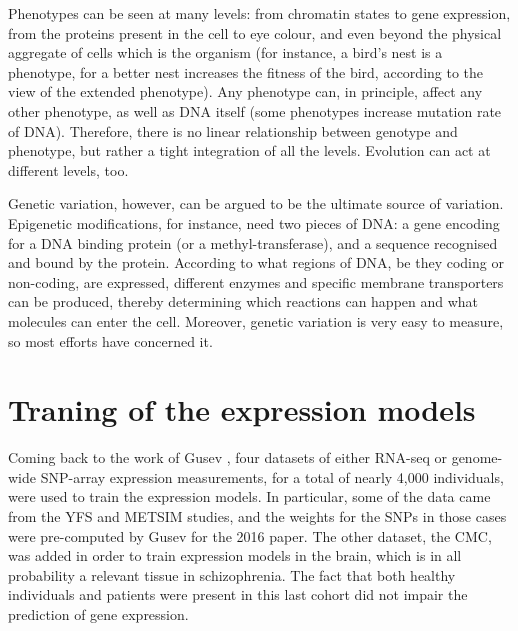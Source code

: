 \documentclass[../main.tex]{subfiles}
\begin{document}
Phenotypes can be seen at many levels: from chromatin states to gene 
expression, from the proteins present in the cell to eye colour, and 
even beyond the physical aggregate of cells which is the organism (for 
instance, a bird's nest is a phenotype, for a better nest increases the 
fitness of the bird, according to the view of the extended 
phenotype\autocite{Dawkins1982}). Any phenotype can, in principle, 
affect any other phenotype, as well as DNA itself (\eg some phenotypes 
increase mutation rate of DNA). Therefore, there is no linear 
relationship between genotype and phenotype, but rather a tight 
integration of all the levels. Evolution can act at different levels, 
too.

Genetic variation, however, can be argued to be the ultimate source of 
variation. Epigenetic modifications, for instance, need two pieces of 
DNA: a gene encoding for a DNA binding protein (or a 
methyl-transferase), and a sequence recognised and bound by the protein. 
According to what regions of DNA, be they coding or non-coding, are 
expressed, different enzymes and specific membrane transporters can be 
produced, thereby determining which reactions can happen and what 
molecules can enter the cell\autocite{Alberts2014}. Moreover, genetic 
variation is very easy to measure, so most efforts have concerned it.

\section{Traning of the expression models}

Coming back to the work of Gusev \etal, four datasets of either RNA-seq 
or genome-wide SNP-array expression measurements, for a total of nearly 
4,000 individuals,  were used to train the expression 
models. In particular, some 
of the data came from the YFS and METSIM studies, and the weights for 
the SNPs in those cases were pre-computed by Gusev \etal for the 2016 
paper. The other dataset, the CMC, was added in order to train 
expression models in the brain, which is in all probability a relevant 
tissue in schizophrenia. The fact that both healthy individuals and 
patients were present in this last cohort did not impair the prediction 
of gene expression.
\end{document}
